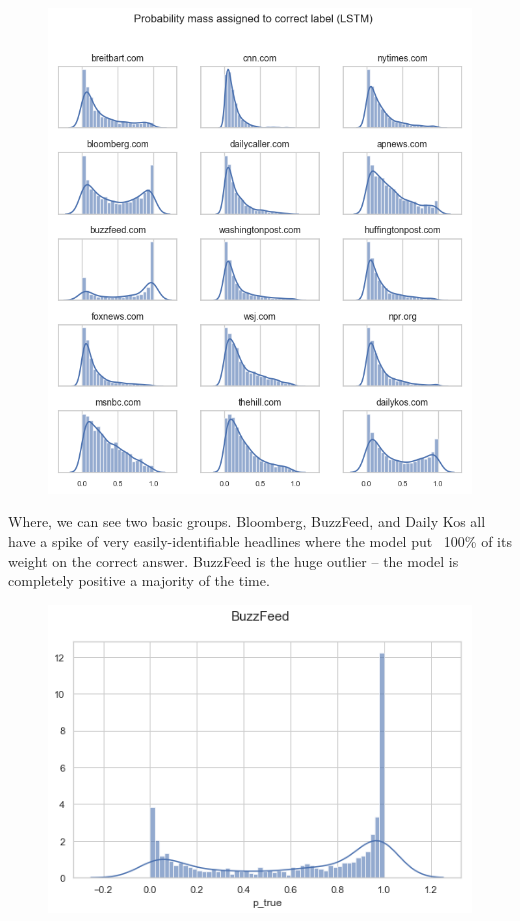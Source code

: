 \documentclass{scrartcl}
\begin{document}
\begin{figure}[H]
  \centering
  \includegraphics[height=0.5\textheight]{figures/ptrue-multiples.png}
\end{figure}

Where, we can see two basic groups. Bloomberg, BuzzFeed, and Daily Kos all have a spike of very easily-identifiable headlines where the model put ~100\% of its weight on the correct answer. BuzzFeed is the huge outlier -- the model is completely positive a majority of the time.

\begin{figure}[H]
  \centering
  \includegraphics[width=\textwidth]{figures/ptrue-buzzfeed.png}
\end{figure}
\end{document}
